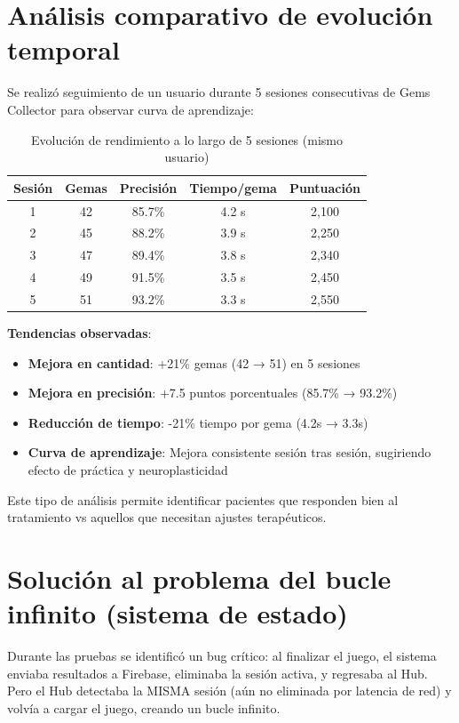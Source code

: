\section{Análisis comparativo de evolución temporal}

Se realizó seguimiento de un usuario durante 5 sesiones consecutivas de Gems Collector para observar curva de aprendizaje:

\begin{table}[h]
\centering
\begin{tabular}{|c|c|c|c|c|}
\hline
\textbf{Sesión} & \textbf{Gemas} & \textbf{Precisión} & \textbf{Tiempo/gema} & \textbf{Puntuación} \\ \hline
1 & 42 & 85.7\% & 4.2 s & 2,100 \\ \hline
2 & 45 & 88.2\% & 3.9 s & 2,250 \\ \hline
3 & 47 & 89.4\% & 3.8 s & 2,340 \\ \hline
4 & 49 & 91.5\% & 3.5 s & 2,450 \\ \hline
5 & 51 & 93.2\% & 3.3 s & 2,550 \\ \hline
\end{tabular}
\caption{Evolución de rendimiento a lo largo de 5 sesiones (mismo usuario)}
\label{tab:evolucion}
\end{table}

\textbf{Tendencias observadas}:
\begin{itemize}
    \item \textbf{Mejora en cantidad}: +21\% gemas (42 → 51) en 5 sesiones
    \item \textbf{Mejora en precisión}: +7.5 puntos porcentuales (85.7\% → 93.2\%)
    \item \textbf{Reducción de tiempo}: -21\% tiempo por gema (4.2s → 3.3s)
    \item \textbf{Curva de aprendizaje}: Mejora consistente sesión tras sesión, sugiriendo efecto de práctica y neuroplasticidad
\end{itemize}

Este tipo de análisis permite identificar pacientes que responden bien al tratamiento vs aquellos que necesitan ajustes terapéuticos.

\section{Solución al problema del bucle infinito (sistema de estado)}

Durante las pruebas se identificó un bug crítico: al finalizar el juego, el sistema enviaba resultados a Firebase, eliminaba la sesión activa, y regresaba al Hub. Pero el Hub detectaba la MISMA sesión (aún no eliminada por latencia de red) y volvía a cargar el juego, creando un bucle infinito.

